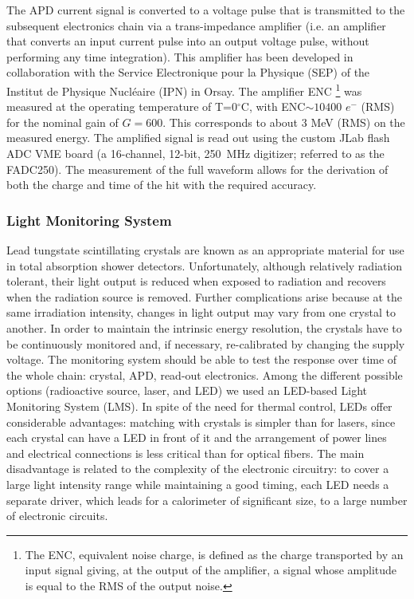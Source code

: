 The APD current signal is converted to a voltage pulse that is transmitted to the subsequent electronics chain via a
trans-impedance amplifier (i.e. an amplifier that converts an input current pulse into an output voltage pulse, without
performing any time integration). This amplifier has been developed in collaboration with the Service Electronique
pour la Physique (SEP) of the Institut de Physique Nucl{\'e}aire (IPN) in Orsay. The amplifier ENC \footnote{The ENC,
  equivalent noise charge, is defined as the charge transported by an input signal giving, at the output of the amplifier,
  a signal whose amplitude is equal to the RMS of the output noise.} was measured at the operating temperature of
T=0$^\circ$C,  with ENC$\sim10400$ $e^-$ (RMS) for the nominal gain of $G=600$.  This corresponds to about 3 MeV (RMS) on the measured energy. The amplified signal is read out using the custom JLab flash
ADC VME board (a 16-channel, 12-bit, 250~MHz digitizer; referred to as the FADC250). The measurement
of the full waveform allows for the derivation of both the charge and time of the hit with the required  accuracy.

\subsubsection{Light Monitoring System}

Lead tungstate scintillating crystals are known as an appropriate material for use in total absorption shower
detectors. Unfortunately, although relatively radiation tolerant, their light output is reduced when exposed to 
radiation and recovers when the radiation source is removed. Further complications arise because at the same
irradiation intensity, changes in light output may vary from one crystal to another. In order to maintain the intrinsic
energy resolution, the crystals have to be continuously monitored and, if necessary, re-calibrated by changing the
supply voltage. The monitoring system should be able to test the response over time of the whole chain: crystal,
APD, read-out electronics. Among the different possible options (radioactive source, laser, and LED) we used an
LED-based Light Monitoring System (LMS). In spite of the need for thermal control, LEDs offer considerable
advantages: matching with crystals is simpler than for lasers, since each crystal can have a LED in front of it and
the arrangement of power lines and electrical connections is less critical than for optical fibers. The main
disadvantage is related to the complexity of the electronic circuitry: to cover a large light intensity range while
maintaining a good timing, each LED needs a separate driver, which leads for a calorimeter of significant size, to
a large number of electronic circuits.

